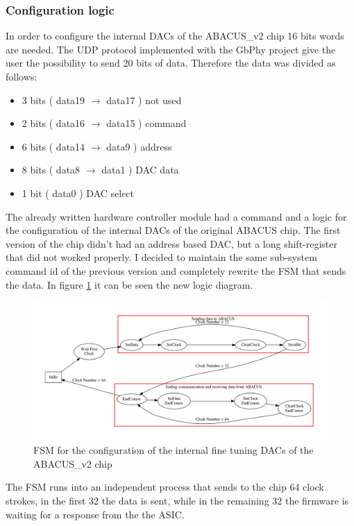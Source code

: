 \subsubsection{Configuration logic}\label{confing}
In order to configure the internal DACs of the ABACUS\_v2 chip 16 bits words are needed. The UDP protocol implemented with the GbPhy project give the user the possibility to send 20 bits of data.
Therefore the data was divided as follows:
\begin{itemize}
	\item 3 bits ( data19 $\rightarrow$ data17 ) not used
	\item 2 bits ( data16 $\rightarrow$ data15 ) command
	\item 6 bits ( data14 $\rightarrow$ data9 ) address
	\item 8 bits ( data8 $\rightarrow$ data1 ) DAC data
	\item 1 bit ( data0 ) DAC select
\end{itemize}
\noindent The already written hardware controller module had a command and a logic for the configuration of the internal DACs of the original ABACUS chip.
The first version of the chip didn't had an address based DAC, but a long shift-register that did not worked properly.
I decided to maintain the same sub-system command id of the previous version and completely rewrite the FSM that sends the data. 
In figure \ref{fig:fsmDACs} it can be seen the new logic diagram.
\begin{figure}[H]
	\centering
	\includegraphics[width=1.0\linewidth]{FSMdiagrams/InternalDACsFSM.pdf}
	\caption{FSM for the configuration of the internal fine tuning DACs of the ABACUS\_v2 chip}
	\label{fig:fsmDACs}
\end{figure}
\noindent The FSM runs into an independent process that sends to the chip 64 clock strokes, in the first 32 the data is sent, while in the remaining 32 the firmware is waiting for a response from the the ASIC.
